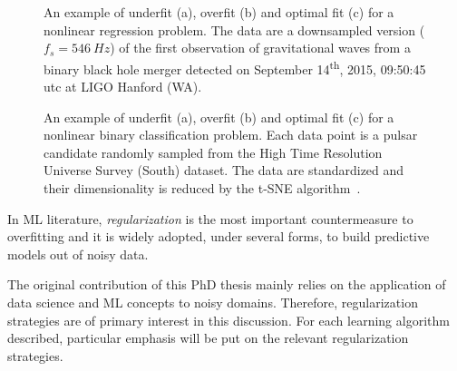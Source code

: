 	  \begin{figure}[!h]
	  	\centering
	      \hfill%
	  	\caption{An example of underfit (a), overfit (b) and optimal fit (c) for a nonlinear regression problem. The data are a downsampled version ($f_s = 546~Hz$) of the first observation of gravitational waves from a binary black hole merger detected on September 14\textsuperscript{th}, 2015, 09:50:45 {\sc utc} at LIGO Hanford (WA).}\label{fig:regression_fit}
	  \end{figure}

	  \begin{figure}[!h]
			\centering
			\hfill%
			\caption{An example of underfit (a), overfit (b) and optimal fit (c) for a nonlinear binary classification problem. Each data point is a pulsar candidate randomly sampled from the High Time Resolution Universe Survey (South) dataset. The data are standardized and their dimensionality is reduced by the \ac{t-SNE} algorithm~\cite{van2008visualizing}. }\label{fig:classification_fit}
	  \end{figure}


      In ML literature, \textit{regularization} is the most important countermeasure to overfitting and it is widely adopted, under several forms, to build predictive models out of noisy data.

	    The original contribution of this PhD thesis mainly relies on the application of data science and ML concepts to noisy domains. Therefore, regularization strategies are of primary interest in this discussion.
	    For each learning algorithm described, particular emphasis will be put on the relevant regularization strategies.

